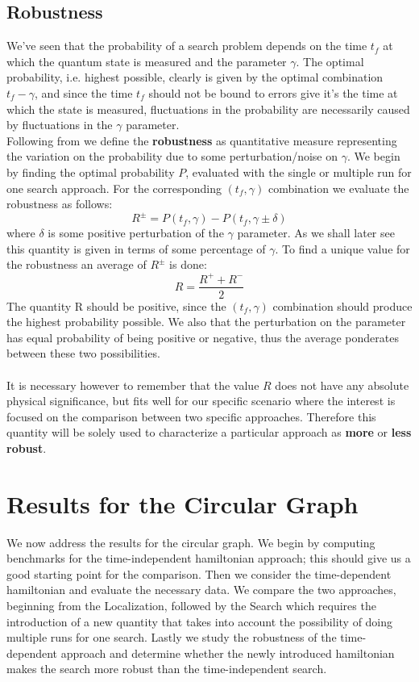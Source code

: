     \subsection{Robustness}
        We've seen that the probability of a search problem depends on the time $t_f$ at which the quantum state is measured and the parameter $\gamma$. The optimal probability, i.e. highest possible, clearly is given by the optimal combination $t_f-\gamma$, and since the time $t_f$ should not be bound to errors give it's the time at which the state is measured, fluctuations in the probability are necessarily caused by fluctuations in the $\gamma$ parameter. \\
        Following from \cite{SH.HungS.Hietala2019} we define the \textbf{robustness} as quantitative measure representing the variation on the probability due to some perturbation/noise on $\gamma$.
        We begin by finding the optimal probability $P$, evaluated with the single or multiple run for one search approach. For the corresponding $(t_f,\gamma)$ combination we evaluate the robustness as follows:
        \begin{equation}
            R ^\pm = P(t_f, \gamma) - P(t_f, \gamma \pm \delta)
        \end{equation}
        where $\delta$ is some positive perturbation of the $\gamma$ parameter. As we shall later see this quantity is given in terms of some percentage of $\gamma$. To find a unique value for the robustness an average of $R^\pm$ is done:
        \begin{equation}
            R = \frac{R^++ R^-}{2}
        \end{equation}
        The quantity R should be positive, since the $(t_f,\gamma)$ combination should produce the highest probability possible. We also that the perturbation on the parameter has equal probability of being positive or negative, thus the average ponderates between these two possibilities. \\ \\It is necessary however to remember that the value $R$ does not have any absolute physical significance, but fits well for our specific scenario where the interest is focused on the comparison between two specific approaches. Therefore this quantity will be solely used to characterize a particular approach as \textbf{more} or \textbf{less robust}.

\section{Results for the Circular Graph}
We now address the results for the circular graph. We begin by computing benchmarks for the time-independent hamiltonian approach; this should give us a good starting point for the comparison. Then we consider the time-dependent hamiltonian and evaluate the necessary data. We compare the two approaches, beginning from the Localization, followed by the Search which requires the introduction of a new quantity that takes into account the possibility of doing multiple runs for one search. Lastly we study the robustness of the time-dependent approach and determine whether the newly introduced hamiltonian makes the search more robust than the time-independent search.

